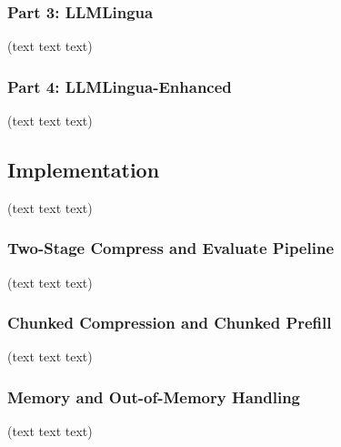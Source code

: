 \documentclass[10pt,a4paper,twocolumn]{article}
\begin{document}

\subsubsection{Part 3: LLMLingua}
(text text text)


\subsubsection{Part 4: LLMLingua-Enhanced}
(text text text)


\subsection{Implementation}
(text text text)


\subsubsection{Two-Stage Compress and Evaluate Pipeline}
(text text text)


\subsubsection{Chunked Compression and Chunked Prefill}
(text text text)


\subsubsection{Memory and Out-of-Memory Handling}
(text text text)
\end{document}
